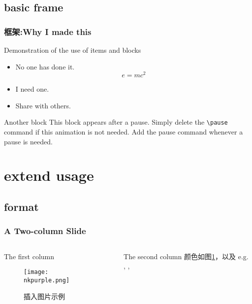 \documentclass[UTF8]{beamer}
\begin{document}
\subsection{basic frame}

\begin{frame}
\frametitle{框架:Why I made this}
\begin{block}{Demonstration of the use of items and blocks}
\begin{itemize}
\item No one has done it.$$e=mc^2$$
\item I need one.
\pause \item Share with others.
\end{itemize}
\end{block}
\pause
\begin{block}{Another block}
This block appears after a pause. Simply delete the \texttt{\textbackslash pause} command if this animation is not needed. Add the pause command whenever a pause is needed. 
\end{block}
\end{frame}

\section{extend usage}
\subsection{format}
\begin{frame}
\frametitle{A Two-column Slide}
\begin{columns} 
\begin{column}{0.5\textwidth} 
\begin{block}{The first column}
\begin{figure}[htb]
	\texttt{[image: nkpurple.png]}
	\caption{插入图片示例}
	\label{fig1}
    \end{figure}
\end{block}
\end{column}
\begin{column}{0.5\textwidth} 
\begin{block}{The second column}
颜色如图\ref{fig1}，以及 e.g. {\color{red}{red}}, {\color{orange}{orange}}, {\color{blue}{blue}}
\vspace{9.5em}
\end{block}
\end{column}
\end{columns}
\end{frame}
\end{document}
